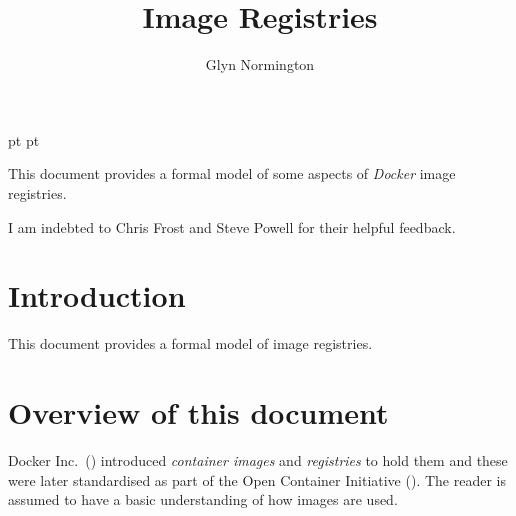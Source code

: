 \documentclass[a4paper,twoside,12pt]{article}
\begin{document}
 pt
 pt

\def\Slash{\slash\hspace{0pt}}

\title{Image Registries}

\author{Glyn Normington}

\maketitle
\thispagestyle{empty}
\setcounter{page}{1}


This document provides a formal model of some aspects of \textit{Docker} image registries.

I am indebted to Chris Frost and Steve Powell for their helpful feedback.


\newcommand{\true}{true}
\newcommand{\false}{false}
\renewcommand{\emptyset}{\varnothing}

\clearpage
\tableofcontents

\cleardoublepage
{}
\setcounter{page}{1}

\section{Introduction}

This document provides a formal model of image registries.

\section{Overview of this document}

Docker Inc.\ (\cite{docker}) introduced \textit{container images} and \textit{registries} to hold them and these were later standardised as part of the Open Container Initiative (\cite{oci}). The reader is assumed to have a basic understanding of how images are used.
\end{document}
